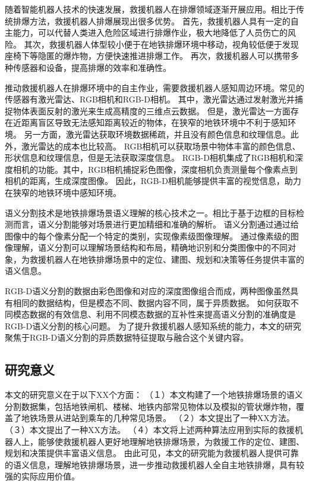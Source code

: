随着智能机器人技术的快速发展，救援机器人在排爆领域逐渐开展应用。相比于传统排爆方法，救援机器人排爆展现出很多优势。
首先，救援机器人具有一定的自主能力，可以代替人类进入危险区域进行排爆作业，极大地降低了人员伤亡的风险。
其次，救援机器人体型较小便于在地铁排爆环境中移动，视角较低便于发现座椅下等隐匿的爆炸物，方便快速推进排爆工作。
再次，救援机器人可以携带多种传感器和设备，提高排爆的效率和准确性。

推动救援机器人在排爆环境中的自主作业，需要救援机器人感知周边环境。常见的传感器有激光雷达、RGB相机和RGB-D相机。
其中，激光雷达通过发射激光并捕捉物体表面反射的激光来生成高精度的三维点云数据。
但是，激光雷达一方面存在近距离盲区导致无法感知距离较近的物体，在狭窄的地铁环境中不利于感知环境。
另一方面，激光雷达获取环境数据稀疏，并且没有颜色信息和纹理信息。此外，激光雷达的成本也比较高。
RGB相机可以获取场景中物体丰富的颜色信息、形状信息和纹理信息，但是无法获取深度信息。
RGB-D相机集成了RGB相机和深度相机的功能。其中，RGB相机捕捉彩色图像，深度相机负责测量每个像素点到相机的距离，生成深度图像。
因此，RGB-D相机能够提供丰富的视觉信息，助力在狭窄的地铁环境中感知环境。

语义分割技术是地铁排爆场景语义理解的核心技术之一。相比于基于边框的目标检测而言，语义分割能够对场景进行更加精细和准确的解析。
语义分割通过通过给图像中的每个像素分配一个特定的类别，实现像素级图像理解。
通过像素级的图像理解，语义分割可以理解场景结构和布局，精确地识别和分类图像中的不同对象，为救援机器人在地铁排爆场景中的定位、建图、规划和决策等任务提供丰富的语义信息。

RGB-D语义分割的数据由彩色图像和对应的深度图像组合而成，两种图像虽然具有相同的数据结构，但是模态不同、数据内容不同，属于异质数据。
如何获取不同模态数据的有效信息、利用不同模态数据的互补性来提高语义分割的准确度是RGB-D语义分割的核心问题。
为了提升救援机器人感知系统的能力，本文的研究聚焦于RGB-D语义分割的异质数据特征提取与融合这个关键内容。


\subsection{研究意义}
本文的研究意义在于以下XX个方面：
（１）本文构建了一个地铁排爆场景的语义分割数据集，包括地铁闸机、楼梯、地铁内部常见物体以及模拟的管状爆炸物，覆盖了地铁场景从进站到乘车的几种常见场景。
（２）本文提出了一种XX方法。
（３）本文提出了一种XX方法。
（４）本文将上述两种算法应用到实际的救援机器人上，能够使救援机器人更好地理解地铁排爆场景，为救援工作的定位、建图、规划和决策提供丰富语义信息。
由此可见，本文的研究能为救援机器人提供可靠的语义信息，理解地铁排爆场景，进一步推动救援机器人全自主地铁排爆，具有较强的实际应用价值。


